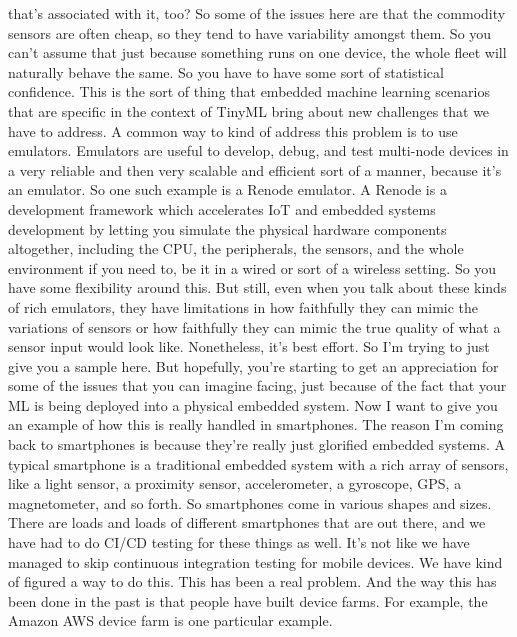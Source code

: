 {{{    that's associated with it, too?
    So some of the issues here are that the commodity sensors are often cheap,
    so they tend to have variability amongst them.
    So you can't assume that just because something runs on one device,
    the whole fleet will naturally behave the same.
    So you have to have some sort of statistical confidence.
    This is the sort of thing that embedded machine learning scenarios
    that are specific in the context of TinyML bring about new challenges
    that we have to address.
    A common way to kind of address this problem is to use emulators.
    Emulators are useful to develop, debug, and test multi-node devices
    in a very reliable and then very scalable and efficient
    sort of a manner, because it's an emulator.
    So one such example is a Renode emulator.
    A Renode is a development framework which
    accelerates IoT and embedded systems development
    by letting you simulate the physical hardware components altogether,
    including the CPU, the peripherals, the sensors, and the whole environment
    if you need to, be it in a wired or sort of a wireless setting.
    So you have some flexibility around this.
    But still, even when you talk about these kinds of rich emulators,
    they have limitations in how faithfully they
    can mimic the variations of sensors or how faithfully they
    can mimic the true quality of what a sensor input would look like.
    Nonetheless, it's best effort.
    So I'm trying to just give you a sample here.
    But hopefully, you're starting to get an appreciation for some of the issues
    that you can imagine facing, just because of the fact
    that your ML is being deployed into a physical embedded system.
    Now I want to give you an example of how this is really handled in smartphones.
    The reason I'm coming back to smartphones
    is because they're really just glorified embedded systems.
    A typical smartphone is a traditional embedded system
    with a rich array of sensors, like a light sensor, a proximity sensor,
    accelerometer, a gyroscope, GPS, a magnetometer, and so forth.
    So smartphones come in various shapes and sizes.
    There are loads and loads of different smartphones that are out there,
    and we have had to do CI/CD testing for these things as well.
    It's not like we have managed to skip continuous integration
    testing for mobile devices.
    We have kind of figured a way to do this.
    This has been a real problem.
    And the way this has been done in the past
    is that people have built device farms.
    For example, the Amazon AWS device farm is one particular example.
}}}
